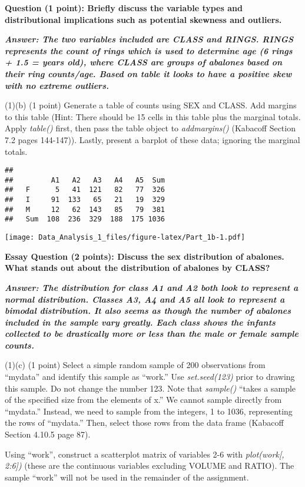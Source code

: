 \documentclass[
]{article}
\begin{document}
\textbf{Question (1 point): Briefly discuss the variable types and
distributional implications such as potential skewness and outliers.}

\textbf{\emph{Answer: The two variables included are CLASS and RINGS.
RINGS represents the count of rings which is used to determine age (6
rings + 1.5 = years old), where CLASS are groups of abalones based on
their ring counts/age. Based on table it looks to have a positive skew
with no extreme outliers. }}

(1)(b) (1 point) Generate a table of counts using SEX and CLASS. Add
margins to this table (Hint: There should be 15 cells in this table plus
the marginal totals. Apply \emph{table()} first, then pass the table
object to \emph{addmargins()} (Kabacoff Section 7.2 pages 144-147)).
Lastly, present a barplot of these data; ignoring the marginal totals.

\begin{verbatim}
##      
##         A1   A2   A3   A4   A5  Sum
##   F      5   41  121   82   77  326
##   I     91  133   65   21   19  329
##   M     12   62  143   85   79  381
##   Sum  108  236  329  188  175 1036
\end{verbatim}

\texttt{[image: Data\_Analysis\_1\_files/figure-latex/Part\_1b-1.pdf]}

\textbf{Essay Question (2 points): Discuss the sex distribution of
abalones. What stands out about the distribution of abalones by CLASS?}

\textbf{\emph{Answer: The distribution for class A1 and A2 both look to
represent a normal distribution. Classes A3, A4 and A5 all look to
represent a bimodal distribution. It also seems as though the number of
abalones included in the sample vary greatly. Each class shows the
infants collected to be drastically more or less than the male or female
sample counts.}}

(1)(c) (1 point) Select a simple random sample of 200 observations from
``mydata'' and identify this sample as ``work.'' Use
\emph{set.seed(123)} prior to drawing this sample. Do not change the
number 123. Note that \emph{sample()} ``takes a sample of the specified
size from the elements of x.'' We cannot sample directly from
``mydata.'' Instead, we need to sample from the integers, 1 to 1036,
representing the rows of ``mydata.'' Then, select those rows from the
data frame (Kabacoff Section 4.10.5 page 87).

Using ``work'', construct a scatterplot matrix of variables 2-6 with
\emph{plot(work{[}, 2:6{]})} (these are the continuous variables
excluding VOLUME and RATIO). The sample ``work'' will not be used in the
remainder of the assignment.
\end{document}
